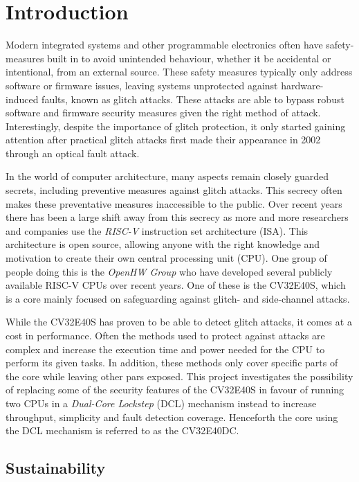\chapter{Introduction}
\label{intro} 

Modern integrated systems and other programmable electronics often have safety-measures built in to avoid unintended behaviour, whether it be accidental or intentional, from an external source. These safety measures typically only address software or firmware issues, leaving systems unprotected against hardware-induced faults, known as glitch attacks. These attacks are able to bypass robust software and firmware security measures given the right method of attack. Interestingly, despite the importance of glitch protection, it only started gaining attention after practical glitch attacks first made their appearance in 2002 through an optical fault attack\cite{trouchkine2019fault}. 

In the world of computer architecture, many aspects remain closely guarded secrets, including preventive measures against glitch attacks. This secrecy often makes these preventative measures inaccessible to the public. Over recent years there has been a large shift away from this secrecy as more and more researchers and companies use the \textit{RISC-V} instruction set architecture (ISA)\cite{riscv_manual}. This architecture is open source, allowing anyone with the right knowledge and motivation to create their own central processing unit (CPU). One group of people doing this is the \textit{OpenHW Group} who have developed several publicly available RISC-V CPUs over recent years. One of these is the CV32E40S, which is a core mainly focused on safeguarding against glitch- and side-channel attacks\cite{cv32e40s_manual}.

While the CV32E40S has proven to be able to detect glitch attacks, it comes at a cost in performance. Often the methods used to protect against attacks are complex and increase the execution time and power needed for the CPU to perform its given tasks. In addition, these methods only cover specific parts of the core while leaving other pars exposed. This project investigates the possibility of replacing some of the security features of the CV32E40S in favour of running two CPUs in a \textit{Dual-Core Lockstep} (DCL) mechanism instead to increase throughput, simplicity and fault detection coverage. Henceforth the core using the DCL mechanism is referred to as the CV32E40DC. 

\section{Sustainability}
\label{sec:sustainability}


